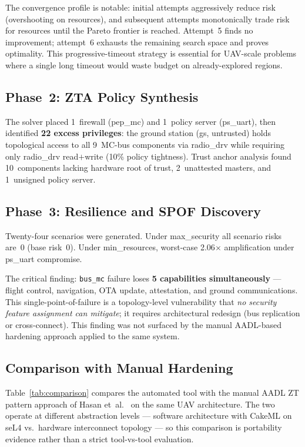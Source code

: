 \documentclass[conference]{IEEEtran}
\begin{document}
The convergence profile is notable: initial attempts aggressively
reduce risk (overshooting on resources), and subsequent attempts
monotonically trade risk for resources until the Pareto frontier is
reached. Attempt~5 finds no improvement; attempt~6 exhausts the
remaining search space and proves optimality. This progressive-timeout
strategy is essential for UAV-scale problems where a single long
timeout would waste budget on already-explored regions.

\subsection{Phase~2: ZTA Policy Synthesis}

The solver placed 1~firewall (pep\_mc) and 1~policy server (ps\_uart),
then identified \textbf{22 excess privileges}: the ground station (gs,
untrusted) holds topological access to all 9~MC-bus components via
radio\_drv while requiring only radio\_drv read$+$write (10\% policy
tightness). Trust anchor analysis found 10~components lacking hardware
root of trust, 2~unattested masters, and 1~unsigned policy server.

\subsection{Phase~3: Resilience and SPOF Discovery}

Twenty-four scenarios were generated. Under max\_security all scenario
risks are~0 (base risk~0). Under min\_resources, worst-case
2.06$\times$ amplification under ps\_uart compromise.

The critical finding: \texttt{bus\_mc} failure loses \textbf{5
capabilities simultaneously} --- flight control, navigation, OTA update,
attestation, and ground communications. This single-point-of-failure is
a topology-level vulnerability that \emph{no security feature assignment
can mitigate}; it requires architectural redesign (bus replication or
cross-connect). This finding was not surfaced by the manual AADL-based
hardening approach applied to the same system.

\subsection{Comparison with Manual Hardening}

Table~\ref{tab:comparison} compares the automated tool with the manual
AADL ZT pattern approach of Hasan et~al.~\cite{hasan_saecps,hasan_jsys}
on the same UAV architecture. The two operate at different abstraction
levels --- software architecture with CakeML on seL4 vs.\ hardware
interconnect topology --- so this comparison is portability evidence
rather than a strict tool-vs-tool evaluation.
\end{document}
